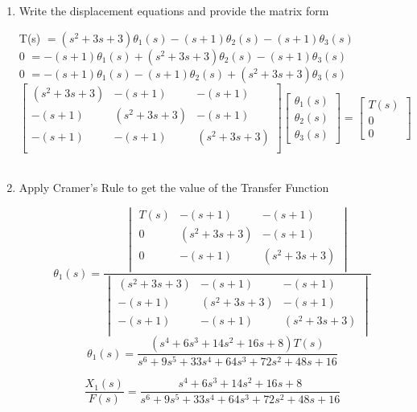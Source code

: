\begin{fold}
\begin{enumerate}[label=(\alph*),itemindent=*, itemindent=*, leftmargin=*, nolistsep]
		\item Write the displacement equations and provide the matrix form
\begin{center}
	T(s) $= (s^2 + 3s + 3)\theta_1(s) - (s + 1)\theta_2(s) - (s + 1)\theta_3(s)$\\
	0 $= -(s + 1)\theta_1(s) +(s^2 + 3s + 3)\theta_2(s) - (s + 1)\theta_3(s)$\\
	0 $= -(s + 1)\theta_1(s) - (s + 1)\theta_2(s) + (s^2 + 3s + 3)\theta_3(s)$\\
	\[
		\begin{bmatrix}
		(s^2 + 3s + 3) & -(s + 1) & -(s + 1)\\
		-(s + 1) & (s^2 + 3s + 3) & -(s + 1)\\
		-(s + 1) & -(s + 1) & (s^2 + 3s + 3)\\
		\end{bmatrix}
		\begin{bmatrix}
		\theta_1(s) \\
		\theta_2(s) \\
		\theta_3(s)
		\end{bmatrix}
		=
		\begin{bmatrix}
		T(s)\\
		0\\
		0
		\end{bmatrix}
	\]\\
\end{center}
		\item Apply Cramer's Rule to get the value of the Transfer Function
\begin{center}
	\[
		\theta_1(s) = 
			\frac{\begin{vmatrix}
				T(s) & -(s + 1) & -(s + 1)\\
				0 & (s^2 + 3s + 3) & -(s + 1)\\
				0 & -(s + 1) & (s^2 + 3s + 3)\\
			\end{vmatrix}
		}{\begin{vmatrix}
				(s^2 + 3s + 3) & -(s + 1) & -(s + 1)\\
				-(s + 1) & (s^2 + 3s + 3) & -(s + 1)\\
				-(s + 1) & -(s + 1) & (s^2 + 3s + 3)\\
			\end{vmatrix}
		}
	\]
	\[
	\theta_1(s) = \frac{(s^4 + 6s^3 + 14s^2 + 16s + 8)T(s)}{s^6 + 9s^5 + 33s^4 + 64s^3 + 72s^2 + 48s + 16}
	\] 

	\[
	\boxed{\frac{X_1(s)}{F(s)} = \frac{s^4 + 6s^3 + 14s^2 + 16s + 8}{s^6 + 9s^5 + 33s^4 + 64s^3 + 72s^2 + 48s + 16}}
	\] 

\end{center}
	\end{enumerate}


\end{fold}


